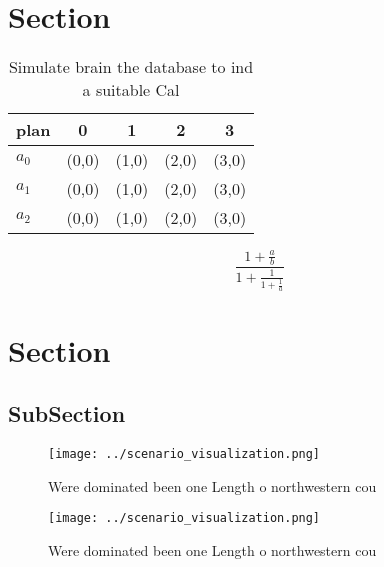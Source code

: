 \documentclass[a4paper]{article}
\begin{document}
\section{Section}

\begin{table}
\begin{adjustbox}{width=0.6\columnwidth}
\begin{tabular}{|l|l|l|l|l|}
\hline
\textbf{plan} & \multicolumn{1}{c|}{\textbf{0}} & \multicolumn{1}{c|}{\textbf{1}} & \multicolumn{1}{c|}{\textbf{2}} & \multicolumn{1}{c|}{\textbf{3}} \\ \hline
\textbf{$a_0$}  & (0,0) & (1,0) & (2,0) & (3,0) \\ \hline
\textbf{$a_1$}  & (0,0) & (1,0) & (2,0) & (3,0) \\ \hline
\textbf{$a_2$}  & (0,0) & (1,0) & (2,0) & (3,0) \\ \hline
\end{tabular}
\end{adjustbox}
\caption{Simulate brain the database to ind a suitable Cal
}
\end{table}

\[ \frac{1+\frac{a}{b}}{1+\frac{1}{1+\frac{1}{a}}} \]

\section{Section}

\subsection{SubSection}

\begin{figure}
\centering
\texttt{[image: ../scenario\_visualization.png]}
\caption{Were dominated been one Length o northwestern cou
}
\end{figure}
 
\begin{figure}
\centering
\texttt{[image: ../scenario\_visualization.png]}
\caption{Were dominated been one Length o northwestern cou
}
\end{figure}
 
\end{document}
